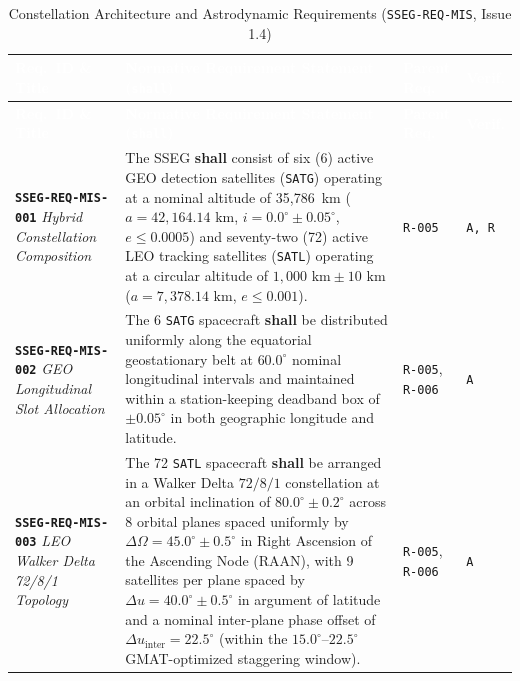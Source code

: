 \documentclass[11pt,a4paper]{article}
\newcommand{\thead}[1]{\textcolor{white}{\textbf{\textsf{#1}}}}
\providecommand{\abbr}[1]{#1}
\begin{document}
{\footnotesize\setlength{\tabcolsep}{4pt}\renewcommand{\arraystretch}{1.15}%
%
%
\setlength{\LTcapwidth}{\textwidth}%
\begin{longtable}{|>{\raggedright\arraybackslash}p{}|>{\raggedright\arraybackslash}p{}|>{\raggedright\arraybackslash}p{}|>{\raggedright\arraybackslash}p{}|}
\caption{Constellation Architecture and Astrodynamic Requirements (\texttt{SSEG-REQ-MIS}, Issue 1.4)}\label{tab:req_mis_i14}\\
\hline
\rowcolor{TableHeaderBlue}
\thead{Req.\ ID \& Title} & \thead{Normative Requirement Statement (\texttt{shall})} & \thead{Parent Req.} & \thead{Verif.} \\ \hline
\endfirsthead
\hline
\rowcolor{TableHeaderBlue}
\thead{Req.\ ID \& Title} & \thead{Normative Requirement Statement (\texttt{shall})} & \thead{Parent Req.} & \thead{Verif.} \\ \hline
\endhead
\endfoot
\endlastfoot
\textbf{\texttt{SSEG-REQ-MIS-001}} \newline \emph{Hybrid Constellation Composition} & The \abbr{SSEG} \textbf{shall} consist of six (6) active \abbr{GEO} detection satellites (\texttt{SATG}) operating at a nominal altitude of 35,786~km ($a = 42{,}164.14\text{ km}$, $i = 0.0^\circ \pm 0.05^\circ$, $e \le 0.0005$) and seventy-two (72) active \abbr{LEO} tracking satellites (\texttt{SATL}) operating at a circular altitude of $1{,}000\text{ km} \pm 10\text{ km}$ ($a = 7{,}378.14\text{ km}$, $e \le 0.001$). & \texttt{R-005} & \texttt{A, R} \\ \hline
\textbf{\texttt{SSEG-REQ-MIS-002}} \newline \emph{GEO Longitudinal Slot Allocation} & The 6 \texttt{SATG} spacecraft \textbf{shall} be distributed uniformly along the equatorial geostationary belt at $60.0^\circ$ nominal longitudinal intervals and maintained within a station-keeping deadband box of $\pm 0.05^\circ$ in both geographic longitude and latitude. & \texttt{R-005}, \newline \texttt{R-006} & \texttt{A} \\ \hline
\textbf{\texttt{SSEG-REQ-MIS-003}} \newline \emph{LEO Walker Delta 72/8/1 Topology} & The 72 \texttt{SATL} spacecraft \textbf{shall} be arranged in a Walker Delta $72/8/1$ constellation at an orbital inclination of $80.0^\circ \pm 0.2^\circ$ across 8 orbital planes spaced uniformly by $\Delta\Omega = 45.0^\circ \pm 0.5^\circ$ in Right Ascension of the Ascending Node (RAAN), with 9 satellites per plane spaced by $\Delta u = 40.0^\circ \pm 0.5^\circ$ in argument of latitude and a nominal inter-plane phase offset of $\Delta u_{\text{inter}} = 22.5^\circ$ (within the $15.0^\circ\text{--}22.5^\circ$ GMAT-optimized staggering window). & \texttt{R-005}, \newline \texttt{R-006} & \texttt{A} \\ \hline

\end{longtable}}
\end{document}
